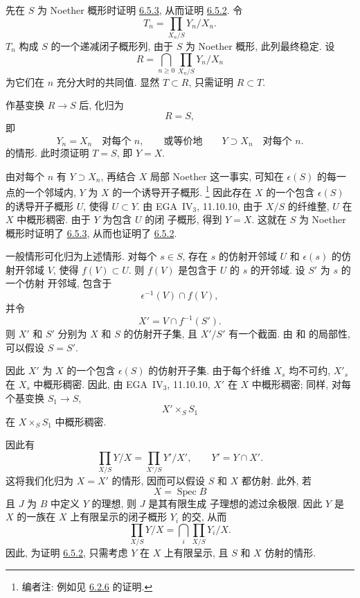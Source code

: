 先在 \(S\) 为 Noether 概形时证明 \hyperref[cor:sga3-VIB-6.5.3]{6.5.3},
从而证明 \hyperref[thm:sga3-VIB-6.5.2]{6.5.2}. 令
\label{eq:sga3-VIB-6.5.3-Tn}%
\[
  T_n=\prod_{X_n/S}Y_n/X_n.
\]
\(T_n\) 构成 \(S\) 的一个递减闭子概形列,
由于 \(S\) 为 Noether 概形, 此列最终稳定.
设
\label{eq:sga3-VIB-6.5.3-R}%
\[
  R=\bigcap_{n\geq0}\prod_{X_n/S}Y_n/X_n
\]
为它们在 \(n\) 充分大时的共同值. 显然
\(T\subset R\), 只需证明 \(R\subset T\).

作基变换 \(R\to S\) 后, 化归为
\[
  R=S,
\]
即
\[
  Y_n=X_n\quad\text{对每个 \(n\)},
  \qquad\text{或等价地}\qquad
  Y\supset X_n\quad\text{对每个 \(n\)}.
\]
的情形. 此时须证明 \(T=S\), 即 \(Y=X\).

由对每个 \(n\) 有 \(Y\supset X_n\), 再结合
\(X\) 局部 Noether 这一事实, 可知在
\(\epsilon(S)\) 的每一点的一个邻域内, \(Y\) 为 \(X\) 的一个诱导开子概形.%
\footnote{\label{note:sga3-VIB-64}编者注: 例如见
\hyperref[cor:sga3-VIB-6.2.6]{6.2.6} 的证明.}
因此存在 \(X\) 的一个包含 \(\epsilon(S)\) 的诱导开子概形 \(U\),
使得 \(U\subset Y\). 由
EGA~IV\(_3\), 11.10.10, 由于 \(X/S\) 的纤维整,
\(U\) 在 \(X\) 中概形稠密. 由于 \(Y\) 为包含 \(U\) 的闭
子概形, 得到 \(Y=X\). 这就在 \(S\) 为 Noether 概形时证明了
\hyperref[cor:sga3-VIB-6.5.3]{6.5.3}, 从而也证明了
\hyperref[thm:sga3-VIB-6.5.2]{6.5.2}.

一般情形可化归为上述情形. 对每个
\(s\in S\), 存在 \(s\) 的仿射开邻域 \(U\)
和 \(\epsilon(s)\) 的仿射开邻域 \(V\),
使得 \(f(V)\subset U\). 则 \(f(V)\) 是包含于 \(U\) 的
\(s\) 的开邻域. 设 \(S'\) 为 \(s\) 的一个仿射
开邻域, 包含于
\[
  \epsilon^{-1}(V)\cap f(V),
\]
并令
\[
  X'=V\cap f^{-1}(S').
\]
则 \(X'\) 和 \(S'\) 分别为 \(X\) 和 \(S\) 的仿射开子集,
且 \(X'/S'\) 有一个截面. 由
 和  的局部性, 可以假设 \(S=S'\).

因此 \(X'\) 为 \(X\) 的一个包含
\(\epsilon(S)\) 的仿射开子集. 由于每个纤维 \(X_s\) 均不可约,
\(X'_s\) 在 \(X_s\) 中概形稠密. 因此, 由
EGA~IV\(_3\), 11.10.10, \(X'\) 在 \(X\) 中概形稠密;
同样, 对每个基变换 \(S_1\to S\),
\[
  X'\times_S S_1
\]
在 \(X\times_S S_1\) 中概形稠密.

因此有
\label{eq:sga3-VIB-6.5.3-open-restriction}%
\[
  \prod_{X/S}Y/X
  =
  \prod_{X'/S}Y'/X',
  \qquad Y'=Y\cap X'.
\]
这将我们化归为 \(X=X'\) 的情形, 因而可以假设
\(S\) 和 \(X\) 都仿射. 此外, 若
\[
  X=\operatorname{Spec}B
\]
且 \(J\) 为 \(B\) 中定义 \(Y\) 的理想, 则 \(J\) 是其有限生成
子理想的滤过余极限. 因此 \(Y\)
是 \(X\) 的一族在 \(X\) 上有限呈示的闭子概形 \(Y_i\)
的交, 从而
\label{eq:sga3-VIB-6.5.3-finite-presentation-reduction}%
\[
  \prod_{X/S}Y/X
  =
  \bigcap_i\prod_{X/S}Y_i/X.
\]
因此, 为证明 \hyperref[thm:sga3-VIB-6.5.2]{6.5.2},
只需考虑 \(Y\) 在 \(X\) 上有限呈示,
且 \(S\) 和 \(X\) 仿射的情形.

